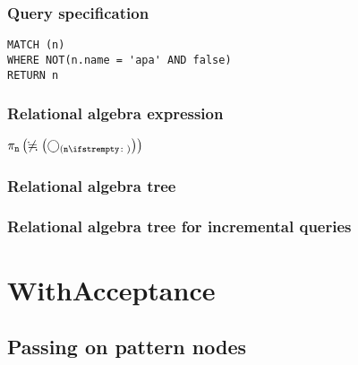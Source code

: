 \subsubsection*{Query specification}

\begin{lstlisting}
MATCH (n)
WHERE NOT(n.name = 'apa' AND false)
RETURN n
\end{lstlisting}

\subsubsection*{Relational algebra expression}

$\projection{\var{n}} \left(\alldifferent{} \left(\getvertices{n}{}\right)\right)$

\subsubsection*{Relational algebra tree}


\subsubsection*{Relational algebra tree for incremental queries}


\section{WithAcceptance}

\subsection{Passing on pattern nodes}

